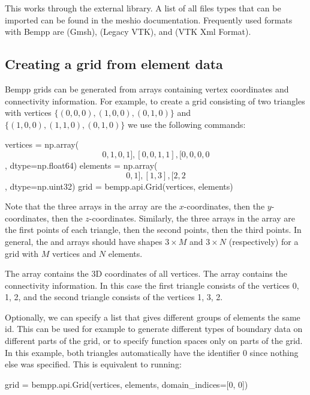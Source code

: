 \documentclass[a4paper]{book}
\begin{document}
This works through the external  library.
A list of all files types that can be imported can be found in the meshio documentation.
Frequently used formats with Bempp are  (Gmsh),
 (Legacy VTK), and  (VTK Xml Format).

\subsection{ Creating a grid from element data}Bempp grids can be generated from arrays containing vertex coordinates and
connectivity information. For example, to create a grid consisting of two
triangles with vertices $\{(0, 0, 0), (1, 0, 0), (0, 1, 0)\}$ and
$\{(1, 0, 0), (1, 1, 0), (0, 1, 0)\}$ we use the following commands:

\begin{python}
vertices = np.array(
    \[0, 1, 0, 1], [0, 0, 1, 1], [0, 0, 0, 0\],
    dtype=np.float64)
elements = np.array(
    \[0, 1], [1, 3], [2, 2\], dtype=np.uint32)
grid = bempp.api.Grid(vertices, elements)
\end{python}

Note that the three arrays in the  array are the $x$-coordinates,
then the $y$-coordinates, then the $z$-coordinates.
Similarly, the three arrays in the  array are the first points of each triangle,
then the second points, then the third points.
In general, the  and  arrays should have shapes $3\times M$ and $3\times N$
(respectively) for a grid with $M$ vertices and $N$ elements.

The array  contains the 3D coordinates of all vertices. The array
 contains the connectivity information. In this case the first
triangle consists of the vertices 0, 1, 2, and the second triangle consists
of the vertices 1, 3, 2.

Optionally, we can specify a list 
that gives different groups of elements the same id. This can be used
for example to generate different types of boundary data on different parts
of the grid, or to specify function spaces only on parts of the grid. In this
example, both triangles automatically have the identifier 0 since nothing
else was specified. This is equivalent to running:

\begin{python}
grid = bempp.api.Grid(vertices, elements, domain_indices=[0, 0])
\end{python}
\end{document}
